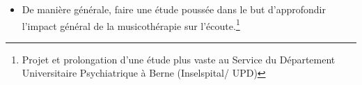 \begin{itemize}
      
       
\item De manière générale, faire une étude poussée dans le but d'approfondir l'impact général de la
  musicothérapie sur l'écoute.\footnote{ Projet et 
  prolongation d'une étude plus vaste au Service du
  Département Universitaire Psychiatrique à Berne (Inselspital/ UPD) }
 
  

\end{itemize}


 





